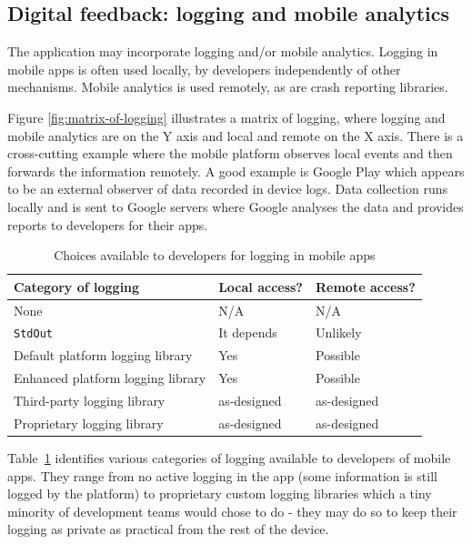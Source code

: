 \subsection{Digital feedback: logging and mobile analytics}
The application may incorporate logging and/or mobile analytics. Logging in mobile apps is often used locally, by developers independently of other mechanisms. Mobile analytics is used remotely, as are crash reporting libraries. 



Figure \ref{fig:matrix-of-logging} illustrates a matrix of logging, where logging and mobile analytics are on the Y axis and local and remote on the X axis. There is a cross-cutting example where the mobile platform observes local events and then forwards the information remotely. A good example is Google Play which appears to be an external observer of data recorded in device logs. Data collection runs locally and is sent to Google servers where Google analyses the data and provides reports to developers for their apps. %

\begin{table}[!htbp]
    \centering
    \begin{tabular}{lll}
         Category of logging &Local access?  &Remote access? \\
         \hline
         None            &N/A  &N/A \\
         \texttt{StdOut} &It depends &Unlikely \\
         Default platform logging library &Yes &Possible \\
         Enhanced platform logging library &Yes &Possible \\
         Third-party logging library &as-designed &as-designed \\
         Proprietary logging library &as-designed &as-designed \\
         
    \end{tabular}
    \caption{Choices available to developers for logging in mobile apps}
    \label{tab:logging-choices-for-devs}
\end{table}

Table~\ref{tab:logging-choices-for-devs} identifies various categories of logging available to developers of mobile apps. They range from no active logging in the app (some information is still logged by the platform) to proprietary custom logging libraries which a tiny minority of development teams would chose to do - they may do so to keep their logging as private as practical from the rest of the device.

